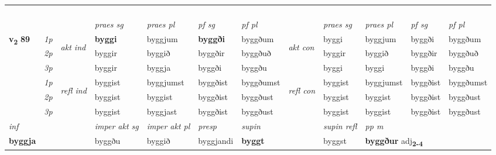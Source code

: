 \begin{longtable}[l]{X>{\footnotesize\itshape}llXXXXlXXXX}
\midrule
 & \\*
   & \\*
   & \\*
  & \\
   \midrule

 & &   & \textit{praes sg}  & \textit{praes pl}    & \textit{ pf sg} & \textit{pf pl} & & \textit{praes sg}  & \textit{praes pl}    & \textit{pf sg} & \textit{pf pl }  \\ \cmidrule{4-7} \cmidrule{9-12}
 \multirow{2}{*}{{{\textbf{v{\textsubscript{2}}} \Large{\textbf{89}}}}}  & 1p & \multirow{3}{*}{\begin{turn}{90}\textit{akt ind}\end{turn}} & \textbf{byggi} & byggjum & \textbf{byggði} & byggðum & \multirow{3}{*}{\begin{turn}{90}\textit{akt con}\end{turn}} &byggi & byggjum & byggði & byggðum\\*
 & 2p &  &  byggir  & byggið & byggðir & byggðuð & & byggir & byggið & byggðir & byggðuð \\*
 & 3p &  & byggir & byggja & byggði & byggðu & & byggi & byggi& byggði & byggðu \\*
\cmidrule{4-7} \cmidrule{9-12}
 & 1p & \multirow{3}{*}{\begin{turn}{90}\textit{refl ind}\end{turn}}  & byggist & byggjumst & byggðist & byggðumst & \multirow{3}{*}{\begin{turn}{90}\textit{refl con}\end{turn}}  &byggist & byggjumst & byggðist & byggðumst \\*
 & 2p &  & byggist & byggist & byggðist & byggðust & &byggist & byggist & byggðist & byggðust \\*
 & 3p  & & byggist & byggjast & byggðist & byggðust & & byggist & byggist& byggðist & byggðust \\*
\cmidrule{4-7} \cmidrule{9-12}

   {\textit{inf}} & &  & \textit{imper akt sg} & \textit{imper akt pl}   & \textit{presp} & \textit{supin} && \textit{supin refl} & \textit{pp m} \\*
  {\textbf{byggja}} & && byggðu  & byggið   & byggjandi &  \textbf{byggt} && byggst & \multicolumn{2}{l}{\textbf{byggður} adj\textbf{\textsubscript{2-4}}} \\*

\midrule


\end{longtable}
